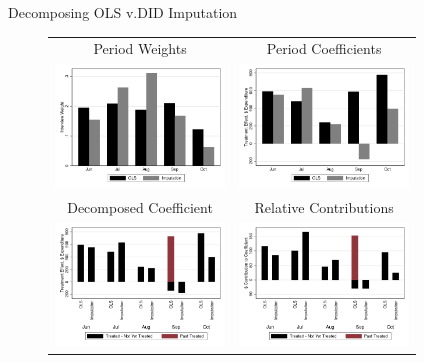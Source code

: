 \documentclass[english,xcolor=svgnames]{beamer}
\begin{document}
\begin{frame}{Decomposing OLS v.DID Imputation}
    \label{decompose_OLSd}

    \begin{figure}
    \centering
    \begin{tabular}{cc}
    Period Weights & Period Coefficients \\
    \includegraphics[width=4.5cm]{figures/BJSvOLSweight_d_totexp2_v2__} &   \includegraphics[width=4.5cm]{figures/BJSvOLScoef_d_totexp2_v2__} \\
    Decomposed Coefficient & Relative Contributions \\
   \includegraphics[width=4.5cm]{figures/BJSvOLScoef_stack_d_totexp2_v2__}& \includegraphics[width=4.5cm]{figures/BJSvOLScontribution_d_totexp2_v2__} \\
    \end{tabular} \\
    
\end{figure}
\end{frame}
\end{document}
